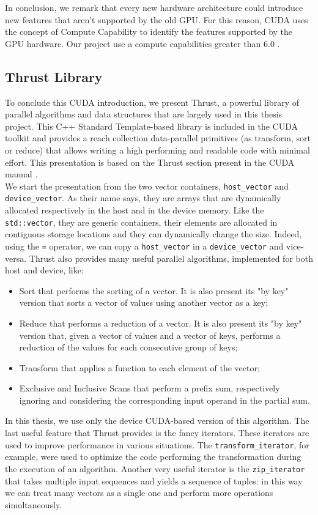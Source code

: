 In conclusion, we remark that every new hardware architecture could introduce new features that aren't supported by the old GPU. For this reason, CUDA uses the concept of Compute Capability to identify the features supported by the GPU hardware. Our project use a compute capabilities greater than 6.0 .

\subsection{Thrust Library}
To conclude this CUDA introduction, we present Thrust, a powerful library of parallel algorithms and data structures that are largely used in this thesis project. This C++ Standard Template-based library is included in the CUDA toolkit and provides a reach collection data-parallel primitives (as transform, sort or reduce) that allows writing a high performing and readable code with minimal effort. This presentation is based on the Thrust section present in the CUDA manual \cite{cuda_manual}.\\
We start the presentation from the two vector containers, \verb|host_vector| and\\\verb|device_vector|. As their name says, they are arrays that are dynamically allocated respectively in the host and in the device memory. Like the \verb|std::vector|, they are generic containers, their elements are allocated in contiguous storage locations and they can dynamically change the size. Indeed, using the \verb|=| operator, we can copy a \verb|host_vector| in a \verb|device_vector| and vice-versa. 
Thrust also provides many useful parallel algorithms, implemented for both host and device, like:
\begin{itemize}
	\item Sort that performs the sorting of a vector. It is also present its "by key" version that sorts a vector of values using another vector as a key;
	\item Reduce that performs a reduction of a vector. It is also present its "by key" version that, given a vector of values and a vector of keys, performs a reduction of the values for each consecutive group of keys;
	\item Transform that applies a function to each element of the vector;
	\item Exclusive and Inclusive Scans that perform a prefix sum, respectively ignoring and considering the corresponding input operand in the partial sum.
\end{itemize}
In this thesis, we use only the device CUDA-based version of this algorithm.
The last useful feature that Thrust provides is the fancy iterators. These iterators are used to improve performance in various situations. The \verb|transform_iterator|, for example, were used to optimize the code performing the transformation during the execution of an algorithm. Another very useful iterator is the \verb|zip_iterator| that takes multiple input sequences and yields a sequence of tuples: in this way we can treat many vectors as a single one and perform more operations simultaneously.